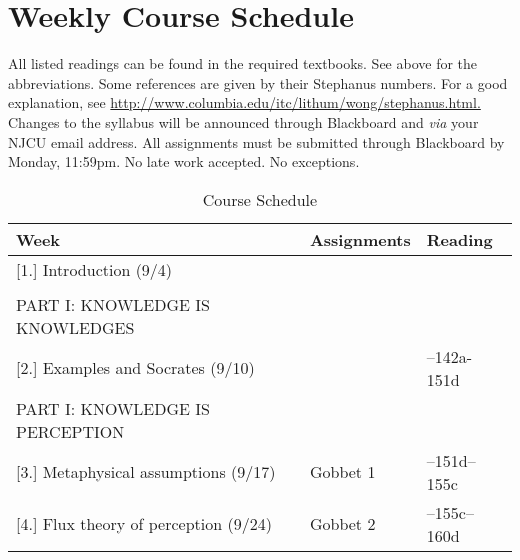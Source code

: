 \documentclass[article,oneside]{memoir}
\begin{document}
\section{Weekly Course Schedule}
All listed readings can be found in the required textbooks. See above for the abbreviations. Some references are given by their Stephanus numbers. For a good explanation, see \href{http://www.columbia.edu/itc/lithum/wong/stephanus.html}{http://www.columbia.edu/itc/lithum/wong/stephanus.html.
} 
 Changes to the syllabus will be announced through Blackboard and \emph{via} your NJCU email address.  All assignments must be submitted through Blackboard by Monday, 11:59pm. No late work accepted. No exceptions.   \newline

\begin{center}
\begin{longtable}{p{4.5cm}p{2cm}p{6cm}}
 
  \caption{Course Schedule} \\
  \toprule
  \textbf{Week} &\textbf{Assignments} & \textbf{Reading} \\
  \midrule

  

[1.] Introduction	(9/4)	  			& 	 			&   \\
								&		  		&    \\ [1.8\baselineskip]
								
PART I: KNOWLEDGE IS KNOWLEDGES		  	\\ [1.8\baselineskip]									

[2.] Examples and Socrates (9/10)					& 				& --142a-151d \\
PART I: KNOWLEDGE IS PERCEPTION		  	\\ [1.8\baselineskip]									
		
[3.] Metaphysical assumptions  (9/17)		& Gobbet 1		&  --151d--155c \\ [1.8\baselineskip]


[4.] Flux theory of perception  (9/24)				& Gobbet 2		& --155c--160d \\ [1.8\baselineskip]




\end{longtable}
\end{center}
\end{document}
